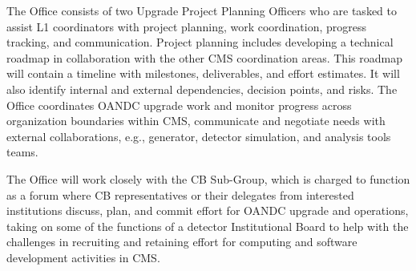 The Office consists of two Upgrade Project Planning Officers who are tasked to assist L1 coordinators with project planning, work coordination, progress tracking, and communication. Project planning includes developing a technical roadmap in collaboration with the other CMS coordination areas. This roadmap will contain a timeline with milestones, deliverables, and effort estimates. It will also identify internal and external dependencies, decision points, and risks. The Office coordinates \gls{OANDC} upgrade work and monitor progress across organization boundaries within CMS, communicate and negotiate needs with external collaborations, e.g., generator, detector simulation, and analysis tools teams.

The Office will work closely with the \gls{CB} Sub-Group, which is charged to function as a forum where \gls{CB} representatives or their delegates from interested institutions discuss, plan, and commit effort for \gls{OANDC} \PhaseTwo upgrade and operations, taking on some of the functions of a detector Institutional Board to help with the challenges in recruiting and retaining effort for computing and software development activities in CMS.





